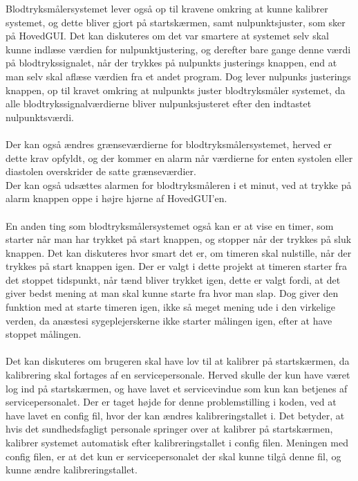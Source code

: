 Blodtryksmålersystemet lever også op til kravene omkring at kunne kalibrer systemet, og dette bliver gjort på startskærmen, samt nulpunktsjuster, som sker på HovedGUI. Det kan diskuteres om det var smartere at systemet selv skal kunne indlæse værdien for nulpunktjustering, og derefter bare gange denne værdi på blodtrykssignalet, når der trykkes på nulpunkts justerings knappen, end at man selv skal aflæse værdien fra et andet program. Dog lever nulpunks justerings knappen, op til kravet omkring at nulpunkts juster blodtryksmåler systemet, da alle blodtrykssignalværdierne bliver nulpunksjusteret efter den indtastet nulpunktsværdi. \\\\
Der kan også ændres grænseværdierne for blodtryksmålersystemet, herved er dette krav opfyldt, og der kommer en alarm når værdierne for enten systolen eller diastolen overskrider de satte grænseværdier. \\
Der kan også udsættes alarmen for blodtryksmåleren i et minut, ved at trykke på alarm knappen oppe i højre hjørne af HovedGUI’en. \\\\
En anden ting som blodtryksmålersystemet også kan er at vise en timer, som starter når man har trykket på start knappen, og stopper når der trykkes på sluk knappen. Det kan diskuteres hvor smart det er, om timeren skal nulstille, når der trykkes på start knappen igen. Der er valgt i dette projekt at timeren starter fra det stoppet tidspunkt, når tænd bliver trykket igen, dette er valgt fordi, at det giver bedst mening at man skal kunne starte fra hvor man slap. Dog giver den funktion med at starte timeren igen, ikke så meget mening ude i den virkelige verden, da anæstesi sygeplejerskerne ikke starter målingen igen, efter at have stoppet målingen. \\\\
Det kan diskuteres om brugeren skal have lov til at kalibrer på startskærmen, da kalibrering skal fortages af en servicepersonale. Herved skulle der kun have været log ind på startskærmen, og have lavet et servicevindue som kun kan betjenes af servicepersonalet. Der er taget højde for denne problemstilling i koden, ved at have lavet en config fil, hvor der kan ændres kalibreringstallet i. Det betyder, at hvis det sundhedsfagligt personale springer over at kalibrer på startskærmen, kalibrer systemet automatisk efter kalibreringstallet i config filen. Meningen med config filen, er at det kun er servicepersonalet der skal kunne tilgå denne fil, og kunne ændre kalibreringstallet. 
